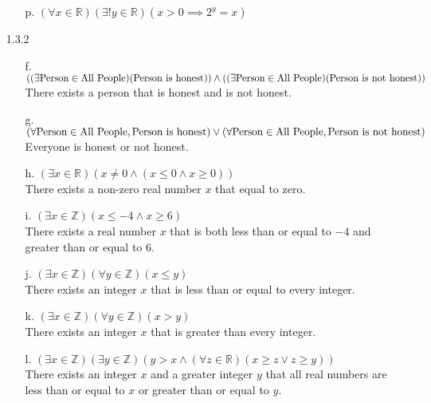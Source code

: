 \documentclass[11pt]{amsart}
\theoremstyle{definition}
\begin{document}
\begin{itemize}
\begin{itemize}
    \item[p.] $(\forall x\in\mathbb{R})(\exists! y\in\mathbb{R})(x>0\implies2^y=x)$
\end{itemize}

\item[1.3.2]
\begin{itemize}
    \item[f.] $((\exists\text{Person}\in\text{All People})(\text{Person is honest}))
         \land \\((\exists\text{Person}\in\text{All People})(\text{Person is not honest}))$ \\
         There exists a person that is honest and is not honest.

    \item[g.] $(\forall\text{Person}\in\text{All People}, \text{Person is honest})
          \lor \\(\forall\text{Person}\in\text{All People}, \text{Person is not honest})$ \\
          Everyone is honest or not honest.

    \item[h.] $(\exists x\in\mathbb{R})(x\ne 0\land (x\le0\land x\ge0))$ \\
        There exists a non-zero real number $x$ that equal to zero.

    \item[i.] $(\exists x\in\mathbb{Z})(x\le-4\land x\ge6)$ \\
        There exists a real number $x$ that is both less than or equal to $-4$ and greater than or equal to 6.

    \item[j.] $(\exists x\in\mathbb{Z})(\forall y\in\mathbb{Z})( x\le y)$ \\
        There exists an integer $x$ that is less than or equal to every integer.

    \item[k.] $(\exists x\in\mathbb{Z})(\forall y\in\mathbb{Z})( x> y)$ \\
        There exists an integer $x$ that is greater than every integer.

    \item[l.] $(\exists x\in\mathbb{Z})(\exists y\in\mathbb{Z})
                (y>x\land (\forall  z\in\mathbb{R})(x\ge z \lor z\ge y))$ \\
        There exists an integer $x$ and a greater integer $y$ that all real numbers are less than or equal to $x$ or greater than or equal to $y$.


\end{itemize}
\end{itemize}
\end{document}
